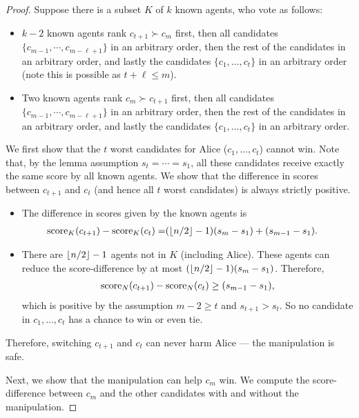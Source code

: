 \begin{proof}

Suppose there is a subset $K$ of $k$ known agents, who vote as follows:
\begin{itemize}
\item $k-2$ known agents rank $c_{t+1} \succ c_m$ first, then all candidates $\{c_{m-1}, \cdots , c_{m-\ell+1}\}$ in an arbitrary order, then the rest of the candidates in an arbitrary order, and lastly the candidates $\{c_1,\ldots,c_t\}$ in an arbitrary order (note this is possible as $t+\ell\leq m$).
\item Two known agents rank $c_m \succ c_{t+1}$ first, then all candidates $\{c_{m-1}, \cdots , c_{m-\ell+1}\}$ in an arbitrary order, then the rest of the candidates in an arbitrary order, and lastly the candidates $\{c_1,\ldots,c_t\}$ in an arbitrary order.
\end{itemize}

We first show that the $t$ worst candidates for Alice ($c_1,\ldots, c_t$) cannot win. 
Note that, by the lemma assumption $s_t = \cdots = s_1$, all these candidates receive exactly the same score by all known agents. We show that the difference in scores between $c_{t+1}$ and $c_t$ (and hence all $t$ worst candidates) is always strictly positive.
\begin{itemize}
\item The difference in scores given by the known agents is 
\begin{align*}
\operatorname{score}_K(c_{t+1})-\operatorname{score}_K(c_t) =
&
(\left\lfloor n/2 \right\rfloor-1)(s_m-s_1) 
+ (s_{m-1}-s_1).
\end{align*}
\item There are
$\left\lfloor n/2 \right\rfloor-1$ agents not in $K$ (including Alice).
These agents can reduce the score-difference by at most 
$(\left\lfloor n/2 \right\rfloor-1)(s_m-s_1)$.
Therefore, 
\begin{align*}
\operatorname{score}_N(c_{t+1})-\operatorname{score}_N(c_t) \geq (s_{m-1}-s_1),
\end{align*}
which is positive 
by the assumption $m-2 \geq t$ and $s_{t+1}>s_t$.
So no candidate in $c_1,\ldots,c_t$ has a chance to win or even tie.
\end{itemize}
Therefore, switching $c_{t+1}$ and $c_t$ can never harm Alice --- the manipulation is safe.

Next, we show that the manipulation can help $c_m$ win. We compute the score-difference between $c_m$ and the other candidates with and without the manipulation. 


\end{proof}
